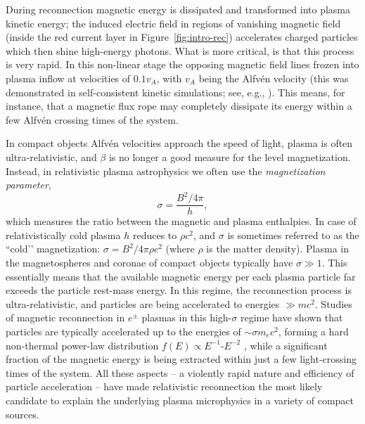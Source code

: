 During reconnection magnetic energy is dissipated and transformed into plasma kinetic energy; the induced electric field in regions of vanishing magnetic field (inside the red current layer in Figure~\ref{fig:intro-rec}) accelerates charged particles which then shine high-energy photons. What is more critical, is that this process is very rapid. In this non-linear stage the opposing magnetic field lines frozen into plasma inflow at velocities of $0.1 v_A$, with $v_A$ being the Alfv\'en velocity (this was demonstrated in self-consistent kinetic simulations; see, e.g., \citealt{2008ApJ...684.1477Z,2012ApJ...750..129B,2014A&A...570A.111M}). This means, for instance, that a magnetic flux rope may completely dissipate its energy within a few Alfv\'en crossing times of the system. 

In compact objects Alfv\'en velocities approach the speed of light, plasma is often ultra-relativistic, and $\beta$ is no longer a good measure for the level magnetization. Instead, in relativistic plasma astrophysics we often use the \emph{magnetization parameter},
\begin{equation*}
\sigma = \frac{B^2/4\pi}{h},
\end{equation*}
which measures the ratio between the magnetic and plasma enthalpies. In case of relativistically cold plasma $h$ reduces to $\rho c^2$, and $\sigma$ is sometimes referred to as the ``cold’’ magnetization: $\sigma = B^2 / 4\pi \rho c^2$ (where $\rho$ is the matter density). Plasma in the magnetospheres and coronae of compact objects typically have $\sigma\gg1$. This essentially means that the available magnetic energy per each plasma particle far exceeds the particle rest-mass energy. In this regime, the reconnection process is ultra-relativistic, and particles are being accelerated to energies $\gg m c^2$. Studies of magnetic reconnection in $e^\pm$ plasmas in this high-$\sigma$ regime have shown that particles are typically accelerated up to the energies of $\sim \sigma m_e c^2$, forming a hard non-thermal power-law distribution $f(E)\propto E^{-1}\text{-}E^{-2}$ \citep[e.g.,][]{2014PhRvL.113o5005G, 2014ApJ...783L..21S,  2016ApJ...816L...8W}, while a significant fraction of the magnetic energy is being extracted within just a few light-crossing times of the system. All these aspects -- a violently rapid nature and efficiency of particle acceleration -- have made relativistic reconnection the most likely candidate to explain the underlying plasma microphysics in a variety of compact sources.

